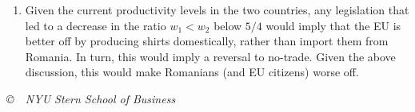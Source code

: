 \documentclass[letterpaper,12pt]{article}
\begin{document}
\begin{enumerate}
\begin{enumerate}
\item Given the current productivity levels in the two countries,
any legislation that led to a decrease in the ratio
$w_{1} < w_{2}$ below $ {5}/{4}$ would imply that the EU
is better off by producing shirts domestically, rather than import
them from Romania. In turn, this would imply a reversal to
no-trade. Given the above discussion, this would make Romanians
(and EU citizens) worse off.
\end{enumerate}


\end{enumerate}


\vfill \centerline{\it \copyright \ \number\year \ NYU Stern
School of Business}
\end{document}
